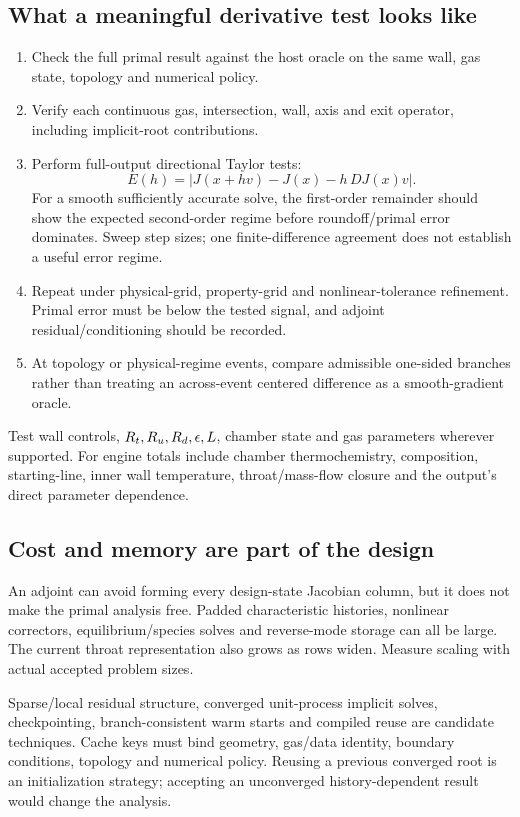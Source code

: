 \subsection{What a meaningful derivative test looks like}
\begin{enumerate}
\item Check the full primal result against the host oracle on the same
wall, gas state, topology and numerical policy.
\item Verify each continuous gas, intersection, wall, axis and exit
operator, including implicit-root contributions.
\item Perform full-output directional Taylor tests:
\[
E(h)=\left|J(x+hv)-J(x)-h\,D J(x)v\right|.
\]
For a smooth sufficiently accurate solve, the first-order remainder
should show the expected second-order regime before roundoff/primal
error dominates. Sweep step sizes; one finite-difference agreement
does not establish a useful error regime.
\item Repeat under physical-grid, property-grid and nonlinear-tolerance
refinement. Primal error must be below the tested signal, and adjoint
residual/conditioning should be recorded.
\item At topology or physical-regime events, compare admissible one-sided
branches rather than treating an across-event centered difference as a
smooth-gradient oracle.
\end{enumerate}
Test wall controls, \(R_t,R_u,R_d,\epsilon,L\), chamber state and gas
parameters wherever supported. For engine totals include chamber
thermochemistry, composition, starting-line, inner wall temperature,
throat/mass-flow closure and the output's direct parameter dependence.

\subsection{Cost and memory are part of the design}
An adjoint can avoid forming every design-state Jacobian column, but it
does not make the primal analysis free. Padded characteristic histories,
nonlinear correctors, equilibrium/species solves and reverse-mode storage
can all be large. The current throat representation also grows as
rows widen. Measure scaling with actual accepted problem sizes.

Sparse/local residual structure, converged unit-process implicit solves,
checkpointing, branch-consistent warm starts and compiled reuse are
candidate techniques. Cache keys must bind geometry, gas/data identity,
boundary conditions, topology and numerical policy. Reusing a previous
converged root is an initialization strategy; accepting an unconverged
history-dependent result would change the analysis.

